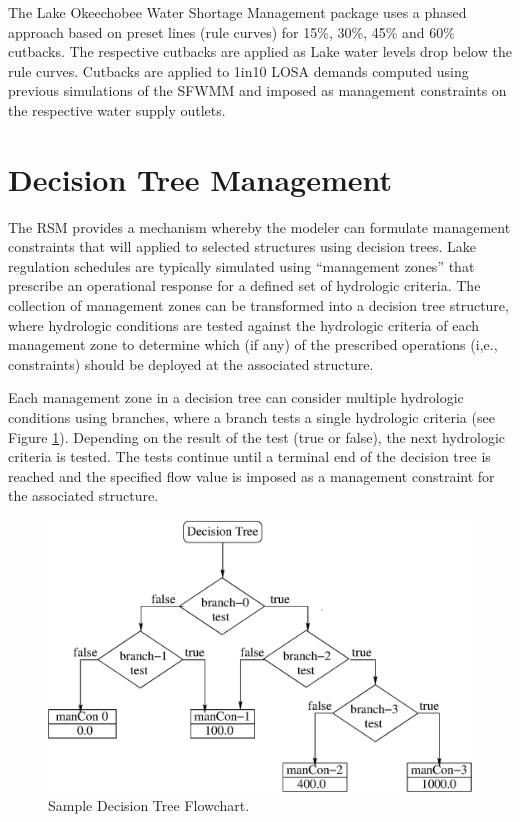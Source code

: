 The Lake Okeechobee Water Shortage Management package uses a phased
approach based on preset lines (rule curves) for 15\%, 30\%, 45\% and
60\% cutbacks.  The respective cutbacks are applied as Lake water
levels drop below the rule curves.  Cutbacks are applied to 1in10 LOSA
demands computed using previous simulations of the SFWMM and imposed
as management constraints on the respective water supply outlets.


\section{Decision Tree Management}\label{Section:DecisionTreeManagement}

The RSM provides a mechanism whereby the modeler can formulate
management constraints that will applied to selected structures using
decision trees. Lake regulation schedules are typically simulated
using ``management zones'' that prescribe an operational response for
a defined set of hydrologic criteria.  The collection of management
zones can be transformed into a decision tree structure, where
hydrologic conditions are tested against the hydrologic criteria of
each management zone to determine which (if any) of the prescribed
operations (i,e., constraints) should be deployed at the associated
structure.

Each management zone in a decision tree can consider multiple
hydrologic conditions using branches, where a branch tests a single
hydrologic criteria (see Figure \ref{flowchartDT}).  Depending on the
result of the test (true or false), the next hydrologic criteria is
tested.  The tests continue until a terminal end of the decision tree
is reached and the specified flow value is imposed as a management
constraint for the associated structure.

\begin{figure}
 \begin{center}
  \includegraphics[scale=.45]{Graphics/flowchartDT.eps}
 \end{center}
 \caption{\label{flowchartDT} Sample Decision Tree Flowchart.}        
\end{figure}

